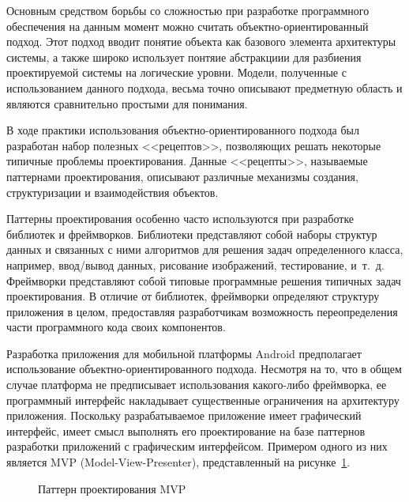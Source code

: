 Основным средством борьбы со сложностью при разработке программного обеспечения
на данным момент можно считать объектно-ориентированный подход.
Этот подход вводит понятие объекта как базового элемента
архитектуры системы, а также широко использует понтяие абстракциии для
разбиения проектируемой системы на логические уровни.
Модели, полученные с использованием данного подхода, весьма точно
описывают предметную область и являются сравнительно простыми для понимания.

В ходе практики использования объектно-ориентированного подхода
был разработан набор полезных <<рецептов>>,
позволяющих решать некоторые типичные проблемы проектирования.
Данные <<рецепты>>, называемые паттернами проектирования,
описывают различные механизмы создания, структуризации и взаимодействия объектов.

Паттерны проектирования особенно часто используются при разработке
библиотек и фреймворков.
Библиотеки представляют собой наборы структур данных и
связанных с ними алгоритмов для решения задач определенного класса,
например, ввод/вывод данных, рисование изображений, тестирование, и~т.~д.
Фреймворки представляют собой типовые программные решения
типичных задач проектирования.
В отличие от библиотек, фреймворки определяют структуру приложения в целом,
предоставляя разработчикам возможность переопределения
части программного кода своих компонентов.

Разработка приложения для мобильной платформы Android предполагает использование
объектно-ориентированного подхода. Несмотря на то, что в общем случае
платформа не предписывает использования какого-либо фреймворка,
ее программный интерфейс накладывает существенные ограничения на
архитектуру приложения.
Поскольку разрабатываемое приложение имеет графический интерфейс,
имеет смысл выполнять его проектирование на базе паттернов
разработки приложений с графическим интерфейсом.
Примером одного из них является MVP (Model-View-Presenter),
представленный на рисунке~\ref{fig:design_mvp}.

\begin{figure}[h!]
  \centering
  \caption{Паттерн проектирования MVP}
  \label{fig:design_mvp}
\end{figure}


